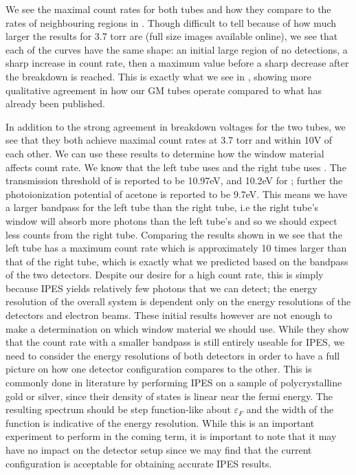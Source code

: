 We see the maximal count rates for both tubes and how they compare to the rates of neighbouring regions in . Though difficult to tell because of how much larger the 
results for 3.7 torr are (full size images available online), we see that each of the curves have the same shape: an initial large region of no detections, a sharp increase in 
count rate, then a maximum value before a sharp decrease after the breakdown is reached. This is exactly what we see in , showing more qualitative agreement in how 
our GM tubes operate compared to what has already been published. 

In addition to the strong agreement in breakdown voltages for the two tubes, we see that they both achieve maximal count rates at 3.7 torr and within 10V of each other. We can use these
results to determine how the window material affects count rate. We know that the left tube uses  and the right tube uses . The transmission threshold of  
is reported to be 10.97eV\cite{lipton2002photon}, and 10.2eV for \cite{funnemann198610}; further the photoionization potential of acetone is reported to be 9.7eV\cite{funnemann198610}.
This means we have a larger bandpass for the left tube than the right tube, i.e the right tube's window will absorb more photons than the left tube's and so we should expect less counts
from the right tube. Comparing the results shown in  we see that the left tube has a maximum count rate which is approximately 10 times larger than that of the right tube, 
which is exactly what we predicted based on the bandpass of the two detectors. Despite our desire for a high count rate, this is simply because IPES yields relatively few photons 
that we can detect; the energy resolution of the overall system is dependent only on the energy resolutions of the detectors and electron beams. These initial results however are 
not enough to make a determination on which window material we should use. While they show that the count rate with a smaller bandpass is still entirely useable for IPES, we need to 
consider the energy resolutions of both detectors in order to have a full picture on how one detector configuration compares to the other. This is commonly done in literature by 
performing IPES on a sample of polycrystalline gold or silver\cite{funnemann198610}\cite{maniraj2011high}, since their density of states is linear near the fermi energy. The resulting 
spectrum should be step function-like about $\varepsilon_F$ and the width of the function is indicative of the energy resolution. While this is an important experiment to perform in the coming term, it 
is important to note that it may have no impact on the detector setup since we may find that the current configuration is acceptable for obtaining accurate IPES results.

